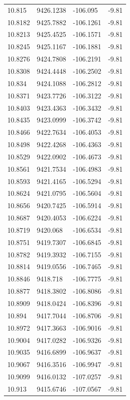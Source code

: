 \begin{table}[H]
\begin{tabular}{llll}
10.815 & 9426.1238 & -106.095 & -9.81 \\
10.8182 & 9425.7882 & -106.1261 & -9.81 \\
10.8213 & 9425.4525 & -106.1571 & -9.81 \\
10.8245 & 9425.1167 & -106.1881 & -9.81 \\
10.8276 & 9424.7808 & -106.2191 & -9.81 \\
10.8308 & 9424.4448 & -106.2502 & -9.81 \\
10.834 & 9424.1088 & -106.2812 & -9.81 \\
10.8371 & 9423.7726 & -106.3122 & -9.81 \\
10.8403 & 9423.4363 & -106.3432 & -9.81 \\
10.8435 & 9423.0999 & -106.3742 & -9.81 \\
10.8466 & 9422.7634 & -106.4053 & -9.81 \\
10.8498 & 9422.4268 & -106.4363 & -9.81 \\
10.8529 & 9422.0902 & -106.4673 & -9.81 \\
10.8561 & 9421.7534 & -106.4983 & -9.81 \\
10.8593 & 9421.4165 & -106.5294 & -9.81 \\
10.8624 & 9421.0795 & -106.5604 & -9.81 \\
10.8656 & 9420.7425 & -106.5914 & -9.81 \\
10.8687 & 9420.4053 & -106.6224 & -9.81 \\
10.8719 & 9420.068 & -106.6534 & -9.81 \\
10.8751 & 9419.7307 & -106.6845 & -9.81 \\
10.8782 & 9419.3932 & -106.7155 & -9.81 \\
10.8814 & 9419.0556 & -106.7465 & -9.81 \\
10.8846 & 9418.718 & -106.7775 & -9.81 \\
10.8877 & 9418.3802 & -106.8086 & -9.81 \\
10.8909 & 9418.0424 & -106.8396 & -9.81 \\
10.894 & 9417.7044 & -106.8706 & -9.81 \\
10.8972 & 9417.3663 & -106.9016 & -9.81 \\
10.9004 & 9417.0282 & -106.9326 & -9.81 \\
10.9035 & 9416.6899 & -106.9637 & -9.81 \\
10.9067 & 9416.3516 & -106.9947 & -9.81 \\
10.9099 & 9416.0132 & -107.0257 & -9.81 \\
10.913 & 9415.6746 & -107.0567 & -9.81 \\

\end{tabular}
\end{table}
